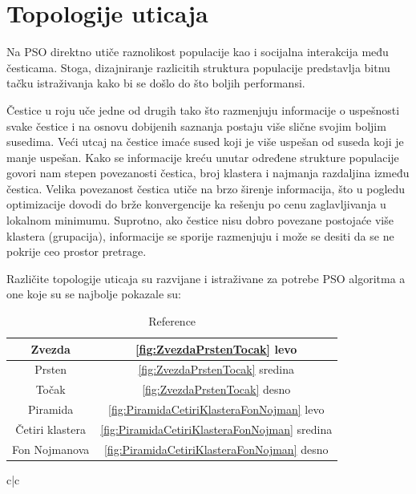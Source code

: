 \documentclass[a4paper]{article}
\begin{document}
\section{Topologije uticaja}


Na PSO direktno utiče raznolikost populacije kao i socijalna interakcija među česticama. Stoga, dizajniranje razlicitih struktura populacije predstavlja bitnu tačku istraživanja kako bi se došlo do što boljih performansi.

Čestice u roju uče jedne od drugih tako što razmenjuju informacije o uspešnosti svake čestice i na osnovu dobijenih saznanja postaju više slične svojim boljim susedima. Veći utcaj na čestice imaće sused koji je više uspešan od suseda koji je manje uspešan. Kako se informacije kreću unutar određene strukture populacije govori nam stepen povezanosti čestica, broj klastera i najmanja razdaljina između čestica. Velika povezanost čestica utiče na brzo širenje informacija, što u pogledu optimizacije dovodi do brže konvergencije ka rešenju po cenu zaglavljivanja u lokalnom minimumu. Suprotno, ako čestice nisu dobro povezane postojaće više klastera (grupacija), informacije se sporije razmenjuju i može se desiti da se ne pokrije ceo prostor pretrage.

Različite topologije uticaja su razvijane i istraživane za potrebe PSO algoritma a one koje su se najbolje pokazale su:

\begin{table}[!b]
    \centering
    \begin{tabular}{| c | c |}
    \hline
        Zvezda &  \ref{fig:ZvezdaPrstenTocak} levo  \\
    \hline    
        Prsten &  \ref{fig:ZvezdaPrstenTocak} sredina \\
    \hline
        Točak & \ref{fig:ZvezdaPrstenTocak} desno \\
    \hline
        Piramida & \ref{fig:PiramidaCetiriKlasteraFonNojman} levo \\
    \hline
        Četiri klastera & \ref{fig:PiramidaCetiriKlasteraFonNojman} sredina\\
    \hline
        Fon Nojmanova & \ref{fig:PiramidaCetiriKlasteraFonNojman} desno \\
    \hline
    \end{tabular}
    \caption{Reference}
    \label{tab:my_label}
\end{table}{c|c}
\end{document}
